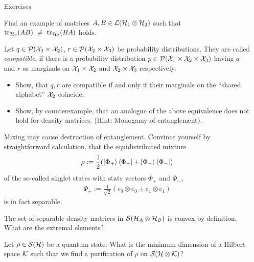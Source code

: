    \begin{section}{Exercises}
     \begin{exercise}
     	Find an example of matrices $A,B \in {\mathcal L}({\mathcal H}_1 \otimes {\mathcal H}_2)$ such that 
     	$\mathrm{tr}_{{\mathcal H}_2}(AB) \ \neq \ \mathrm{tr}_{{\mathcal H}_2}(BA)$ holds.
     \end{exercise}
     
   \begin{exercise}
   Let $q \in {\mathcal P}({\mathcal X}_1 \times {\mathcal X}_2)$, $r \in {\mathcal P}({\mathcal X}_2 \times {\mathcal X}_3)$ be probability distributions. They are called \emph{compatible}, if there is a probability distribution $p \in {\mathcal P}({\mathcal X}_1 \times {\mathcal X}_2 \times {\mathcal X}_3)$ 
   having $q$ and $r$ as marginals on ${\mathcal X}_1 \times {\mathcal X}_2$ and ${\mathcal X}_2 \times {\mathcal X}_3$ respectively. 
   \begin{itemize}
    \item Show, that $q, r$ are compatible if and only if their marginals on the ``shared alphabet'' ${\mathcal X}_2$ coincide.
    \item Show, by counterexample, that an analogue of the above equivalence does not hold for density matrices. (Hint: Monogamy of entanglement).
   \end{itemize}
   \end{exercise}
   \begin{exercise}
    Mixing may cause destruction of entanglement. Convince yourself by straightforward calculation, that the equidistributed mixture 
    \begin{align}
     \rho := \frac{1}{2}(\ket{\Phi_+}\bra{\Phi_+} + \ket{\Phi_-}\bra{\Phi_-})
    \end{align}
   of the so-called singlet states with state vectors $\Phi_+$ and $\Phi_-$,
   \begin{align}
    \Phi_{\pm} := \frac{1}{\sqrt{2}}( e_0 \otimes e_0 \pm e_1 \otimes e_1 ) 
   \end{align}
   is in fact separable.
   \end{exercise}
   \begin{exercise}
    The set of separable density matrices in ${\mathcal S}({\mathcal H}_A \otimes {\mathcal H}_B)$ is convex by definition. What are the extremal elements?
   \end{exercise}
	\begin{exercise}\label{ex:schmidt_dec}
		Let $\rho \in {\mathcal S}({\mathcal H})$ be a quantum state. What is the minimum dimension of a Hilbert space ${\mathcal K}$ such that we find a purification of $\rho$ on ${\mathcal S}({\mathcal H} \otimes {\mathcal K})$?
    \end{exercise}

\end{section}
